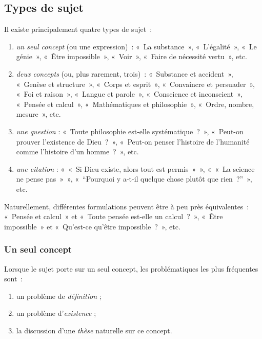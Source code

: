 \documentclass[a4paper]{article}
\begin{document}
\subsection{Types de sujet}
\label{sec-2-3}

Il existe principalement quatre types de sujet :

\begin{enumerate}
\item \emph{un seul concept} (ou une expression) : « La substance », « L'égalité »,
« Le génie », « Être impossible », « Voir », « Faire de nécessité vertu »,
etc.

\item \emph{deux concepts} (ou, plus rarement, trois) : « Substance et
accident », « Genèse et structure », « Corps et esprit »,
« Convaincre et persuader », « Foi et raison », « Langue et parole »,
« Conscience et inconscient », « Pensée et calcul », « Mathématiques
et philosophie », « Ordre, nombre, mesure », etc.

\item \emph{une question} : « Toute philosophie est-elle systématique ? »,
« Peut-on prouver l'existence de Dieu ? », « Peut-on penser l'histoire
de l'humanité comme l'histoire d'un homme ? », etc.

\item \emph{une citation} : « « Si Dieu existe, alors tout est permis » »,
« « La science ne pense pas » », « ``Pourquoi y a-t-il quelque chose
plutôt que rien ?'' », etc.
\end{enumerate}

Naturellement, différentes formulations peuvent être à peu près
équivalentes : « Pensée et calcul » et « Toute pensée est-elle un
calcul ? », « Être impossible » et « Qu'est-ce qu'être impossible ? », etc.

\subsubsection{Un seul concept}
\label{sec-2-3-1}

Lorsque le sujet porte sur un seul concept, les problématiques les plus
fréquentes sont :

\begin{enumerate}
\item un problème de \emph{définition} ;

\item un problème d'\emph{existence} ;

\item la discussion d'une \emph{thèse} naturelle sur ce concept.
\end{enumerate}
\end{document}
